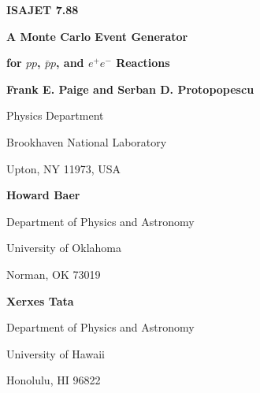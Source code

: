 \documentclass[12pt]{article}
\begin{document}
\centerline{\Large\bf ISAJET 7.88}
\medskip
\centerline{\Large\bf A Monte Carlo Event Generator}
\medskip
\centerline{\Large\bf for $pp$, $\bar pp$, and $e^+e^-$ Reactions}
\bigskip\bigskip
\centerline{\bf Frank E. Paige and Serban D. Protopopescu}
\smallskip
\centerline{Physics Department}
\centerline{Brookhaven National Laboratory}
\centerline{Upton, NY 11973, USA}
\bigskip
\centerline{\bf Howard Baer}
\smallskip
\centerline{Department of Physics and Astronomy}
\centerline{University of Oklahoma}
\centerline{Norman, OK 73019}
\bigskip
\centerline{\bf Xerxes Tata}
\centerline{Department of Physics and Astronomy}
\centerline{University of Hawaii}
\centerline{Honolulu, HI 96822}

\bigskip\bigskip
\tableofcontents
\newpage




%










\end{document}
